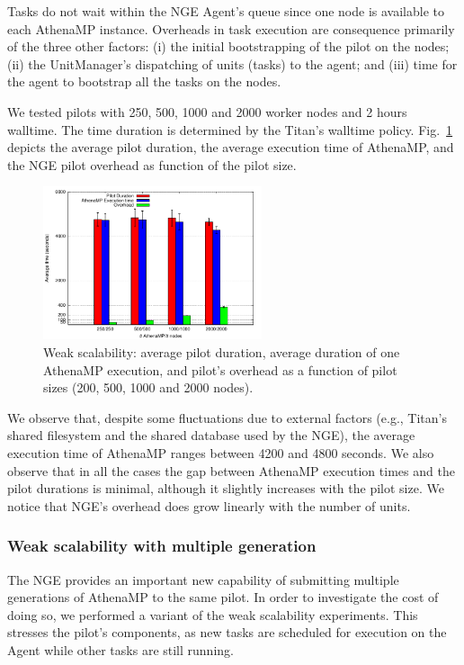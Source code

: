 \documentclass[conference]{IEEEtran}
\begin{document}
Tasks do not  wait within the NGE Agent's queue since  one node  is available to
each AthenaMP instance.  Overheads in task execution are consequence primarily
of the three other factors: (i) the  initial bootstrapping of the pilot on the
nodes; (ii) the UnitManager's dispatching of  units (tasks) to the agent; and
(iii) time for the agent to bootstrap all the tasks on the nodes.

We tested  pilots  with 250, 500, 1000 and 2000 worker nodes and 2 hours
walltime. The time duration is determined by the Titan's walltime policy.
Fig.~\ref{fig:weakScal1a} depicts the average pilot duration, the average
execution time of AthenaMP, and the NGE pilot overhead as function of the pilot
size.

\begin{figure}[!t]
        \includegraphics[height=4.5cm,width=\columnwidth]{weak1.pdf}
    \caption{Weak scalability: average pilot duration, average duration of one AthenaMP execution, and pilot's overhead as a function of pilot sizes (200, 500, 1000 and 2000 nodes).}
\label{fig:weakScal1a}
\end{figure}

We observe that, despite some fluctuations due to external factors (e.g.,
Titan's shared filesystem and the shared database used by the NGE), the average
execution time of AthenaMP  ranges between 4200 and 4800 seconds.  We  also
observe that in all the cases the gap between AthenaMP execution times and the
pilot durations is minimal, although it slightly increases with the pilot size.
We  notice that NGE's overhead does grow linearly with the number of units.

\subsubsection{Weak scalability with multiple generation }

The NGE provides an important new capability of submitting multiple generations
of AthenaMP to the same pilot. In order to investigate the cost of doing so, we
performed a variant of the weak scalability experiments. This stresses the
pilot's components, as new tasks are scheduled for execution on the Agent while
other tasks are still running.
\end{document}

